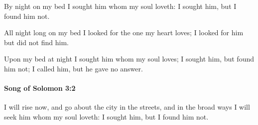 			\begin{versebox}
					\item[BHS] 
					\item[LXX] 
					\item[ASV] By night on my bed I sought him whom my soul loveth: I sought him, but I found him not.
					\item[NIV] All night long on my bed I looked for the one my heart loves; I looked for him but did not find him.
					\item[NRSV] Upon my bed at night I sought him whom my soul loves; I sought him, but found him not; I called him, but he gave no answer.
			\end{versebox}

		\paragraph{Song of Solomon 3:2} %
			\label{SONGOFSOLOMON-3-2}

			I will rise now, and go about the city in the streets, and in the broad ways I will seek him whom my soul loveth: I sought him, but I found him not.

